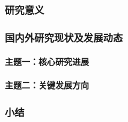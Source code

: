
\subsubsection{研究意义}
\justifying\indent

\subsubsection{国内外研究现状及发展动态}
\indent

\paragraph{主题一：核心研究进展}

\paragraph{主题二：关键发展方向}

\subsubsection{小结}
\indent
